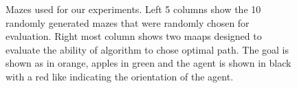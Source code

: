 \begin{figure}[t!]%
\centering%

\caption{Mazes used for our experiments. Left 5 columns show the 10 randomly generated mazes that were randomly chosen for evaluation. Right most column shows two maaps designed to evaluate the ability of algorithm to chose optimal path. The goal is shown as in orange, apples in green and the agent is shown in black with a red like indicating the orientation of the agent.}%
\label{fig:environments}
\end{figure}
